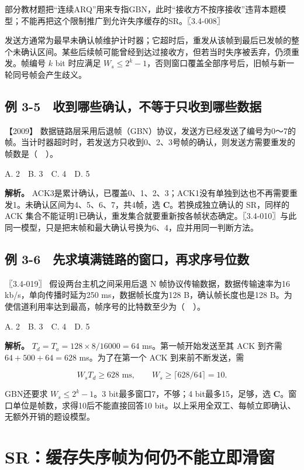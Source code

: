 部分教材题把``连续ARQ''用来专指GBN，此时``接收方不按序接收''违背本题模型；不能再把这个限制推广到允许失序缓存的SR。〖3.4-008〗

发送方通常为最早未确认帧维护计时器；它超时后，重发从该帧到最后已发帧的整个未确认区间。某些后续帧可能曾经到达过接收方，但若当时失序被丢弃，仍须重发。帧编号 \(k\) bit 时应满足 \(W_s\le2^k-1\)，否则窗口覆盖全部序号后，旧帧与新一轮同号帧会产生歧义。

\subsection{例 3-5　收到哪些确认，不等于只收到哪些数据}\label{cn-ex3-5}

\noindent{}【2009】 数据链路层采用后退帧（GBN）协议，发送方已经发送了编号为0～7的帧。当计时器超时时，若发送方只收到0、2、3号帧的确认，则发送方需要重发的帧数是（　）。

A. 2　B. 3　C. 4　D. 5


\textbf{解析。} ACK3是累计确认，已覆盖0、1、2、3；ACK1没有单独到达也不再需要重发1。未确认区间为4、5、6、7，共4帧，选 \textbf{C}。若换成独立确认的 SR，同样的 ACK 集合不能证明1已确认，重发集合就要重新按各帧状态确定。〖3.4-010〗与此同一模型，只是把末帧和最大确认号换为6、4，应并用同一判断方法。

\subsection{例 3-6　先求填满链路的窗口，再求序号位数}\label{cn-ex3-6}

\noindent{}〖3.4-019〗 假设两台主机之间采用后退 N 帧协议传输数据，数据传输速率为16 kb/s，单向传播时延为250 ms，数据帧长度为128 B，确认帧长度也是128 B。为使信道利用率达到最高，帧序号的比特数至少为（　）。

A. 2　B. 3　C. 4　D. 5


\textbf{解析。} \(T_d=T_a=128\times8/16000=64\) ms。第一帧开始发送至其 ACK 到齐需 \(64+500+64=628\) ms。为了在第一个 ACK 到来前不断发送，需

\[W_sT_d\ge628\text{ ms},\qquad W_s\ge\lceil628/64\rceil=10.\]

GBN还要求 \(W_s\le2^k-1\)。3 bit最多窗口7，不够；4 bit最多15，足够，选 \textbf{C}。窗口单位是帧数，求得10后不能直接回答10 bit。以上采用全双工、每帧立即确认、无额外开销的题设模型。

\section{SR：缓存失序帧为何仍不能立即滑窗}\label{cn-03-08}

